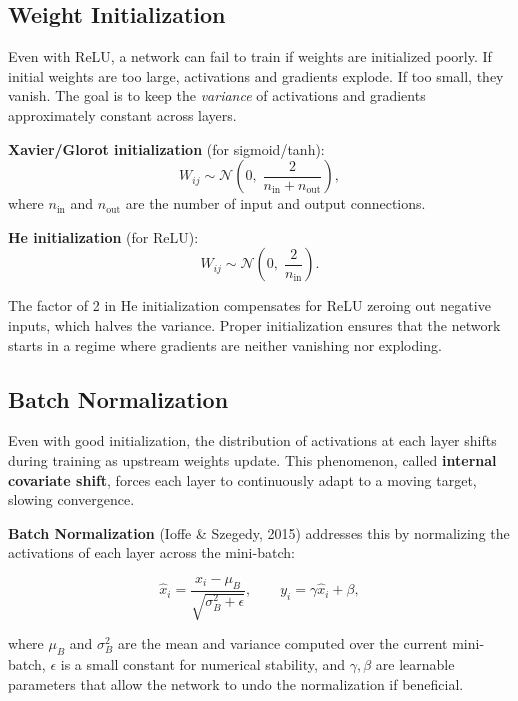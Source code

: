 \documentclass[12pt]{article}
\begin{document}
\subsection{Weight Initialization}

Even with ReLU, a network can fail to train if weights are initialized poorly. If initial weights are too large, activations and gradients explode. If too small, they vanish. The goal is to keep the \textit{variance} of activations and gradients approximately constant across layers.

\textbf{Xavier/Glorot initialization} (for sigmoid/tanh):
\begin{equation}
    W_{ij} \sim \mathcal{N}\!\left(0,\; \frac{2}{n_{\text{in}} + n_{\text{out}}}\right),
    \label{t13eq:xavier}
\end{equation}
where $n_{\text{in}}$ and $n_{\text{out}}$ are the number of input and output connections.

\textbf{He initialization} (for ReLU):
\begin{equation}
    W_{ij} \sim \mathcal{N}\!\left(0,\; \frac{2}{n_{\text{in}}}\right).
    \label{t13eq:he}
\end{equation}

The factor of 2 in He initialization compensates for ReLU zeroing out negative inputs, which halves the variance. Proper initialization ensures that the network starts in a regime where gradients are neither vanishing nor exploding.

\subsection{Batch Normalization}

Even with good initialization, the distribution of activations at each layer shifts during training as upstream weights update. This phenomenon, called \textbf{internal covariate shift}, forces each layer to continuously adapt to a moving target, slowing convergence.

\textbf{Batch Normalization} (Ioffe \& Szegedy, 2015) addresses this by normalizing the activations of each layer across the mini-batch:

\begin{equation}
    \hat{x}_i = \frac{x_i - \mu_B}{\sqrt{\sigma_B^2 + \epsilon}}, \qquad
    y_i = \gamma \hat{x}_i + \beta,
    \label{t13eq:batchnorm}
\end{equation}

where $\mu_B$ and $\sigma_B^2$ are the mean and variance computed over the current mini-batch, $\epsilon$ is a small constant for numerical stability, and $\gamma, \beta$ are learnable parameters that allow the network to undo the normalization if beneficial.
\end{document}
